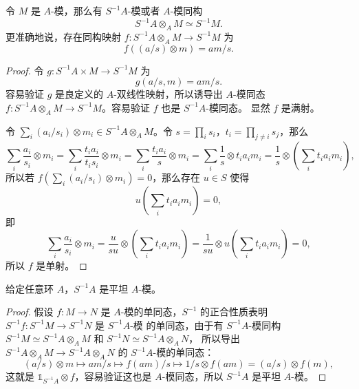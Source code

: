 \begin{proposition}\label{prop:isomorphism of fraction}
  令 $M$ 是 $A$-模，那么有 $S^{-1}A$-模或者 $A$-模同构
  \[
    S^{-1}A\otimes_AM\simeq S^{-1}M.  
  \]
  更准确地说，存在同构映射 $f:S^{-1}A\otimes_AM\to S^{-1}M$ 为
  \[
    f((a/s)\otimes m)=am/s.  
  \]
\end{proposition}
\begin{proof}
  令 $g:S^{-1}A\times M\to S^{-1}M$ 为
  \[
    g(a/s,m)=am/s .
  \]
  容易验证 $g$ 是良定义的 $A$-双线性映射，所以诱导出 $A$-模同态
  $f:S^{-1}A\otimes_AM\to S^{-1}M$。容易验证 $f$ 也是 $S^{-1}A$-模同态。
  显然 $f$ 是满射。

  令 $\sum_i (a_i/s_i)\otimes m_i\in S^{-1}A\otimes_AM$。令
  $s=\prod_i s_i$，$t_i=\prod_{j\neq i}s_j$，那么
  \[
    \sum_i \frac{a_i}{s_i}\otimes m_i=
    \sum_i \frac{t_ia_i}{t_is_i}\otimes m_i
    =\sum_i \frac{t_ia_i}{s}\otimes m_i
    =\sum_i \frac{1}{s}\otimes t_ia_im_i
    =\frac{1}{s}\otimes\left(\sum_i t_ia_i m_i\right),
  \]
  所以若 $f(\sum_i (a_i/s_i)\otimes m_i)=0$，那么存在 $u\in S$ 使得
  \[
    u\left(\sum_i t_ia_i m_i\right)=0,
  \]
  即
  \[
    \sum_i \frac{a_i}{s_i}\otimes m_i=\frac{u}{su}\otimes\left(\sum_i t_ia_i m_i\right)
    =\frac{1}{su}\otimes u\left(\sum_i t_ia_i m_i\right)=0,
  \]
  所以 $f$ 是单射。
\end{proof}

\begin{corollary}
  给定任意环 $A$，$S^{-1}A$ 是平坦 $A$-模。
\end{corollary}
\begin{proof}
  假设 $f:M\to N$ 是 $A$-模的单同态，$S^{-1}$ 的正合性质表明 $S^{-1}f:S^{-1}M\to S^{-1}N$ 是 $S^{-1}A$-模
  的单同态，由于有 $S^{-1}A$-模同构 $S^{-1}M\simeq S^{-1}A\otimes_AM$ 和 $S^{-1}N\simeq S^{-1}A\otimes_AN$，
  所以导出 $S^{-1}A\otimes_AM\to S^{-1}A\otimes_AN$ 的 $S^{-1}A$-模的单同态：
  \[
    (a/s)\otimes m\mapsto am/s\mapsto f(am)/s\mapsto   1/s\otimes f(am)=(a/s)\otimes f(m),
  \]
  这就是 $\mathbb{1}_{S^{-1}A}\otimes f$，容易验证这也是 $A$-模同态，所以 $S^{-1}A$ 是平坦 $A$-模。
\end{proof}

